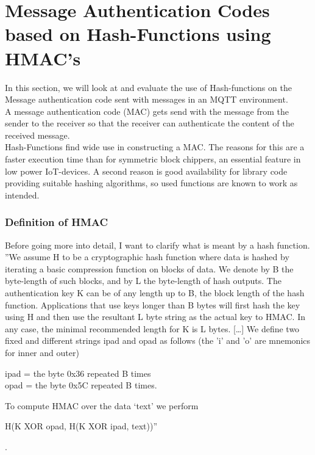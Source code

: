 \section{Message Authentication Codes based on Hash-Functions using HMAC's}

In this section, we will look at and evaluate the use of Hash-functions on the Message authentication code sent with messages in an MQTT environment. \\
A message authentication code (MAC) gets send with the message from the sender to the receiver so that the receiver can authenticate the content of the received message. \\
Hash-Functions find wide use in constructing a MAC. The reasons for this are a faster execution time than for symmetric block chippers, an essential feature in low power IoT-devices. A second reason is good availability for library code providing suitable hashing algorithms, so used functions are known to work as intended. 
\subsubsection{Definition of HMAC}
Before going more into detail, I want to clarify what is meant by a hash function. ''We assume H to be a cryptographic hash function where data is hashed by iterating a basic compression function on blocks of data. We denote by B the byte-length of such blocks, and by L the byte-length of hash outputs. The authentication key K can be of any length up to B, the block length of the hash function. Applications that use keys longer than B bytes will first hash the key using H and then use the resultant L byte string as the actual key to HMAC. In any case, the minimal recommended length for K is L bytes. [\dots] We define two fixed and different strings ipad and opad as follows (the ’i’ and ’o’ are mnemonics for inner and outer)
\begin{center}
ipad = the byte 0x36 repeated B times \\
opad = the byte 0x5C repeated B times.
\end{center}
To compute HMAC over the data ‘text’ we perform 
\begin{center}
H(K XOR opad, H(K XOR ipad, text))''
\end{center}
\cite{RFC}.  \\

